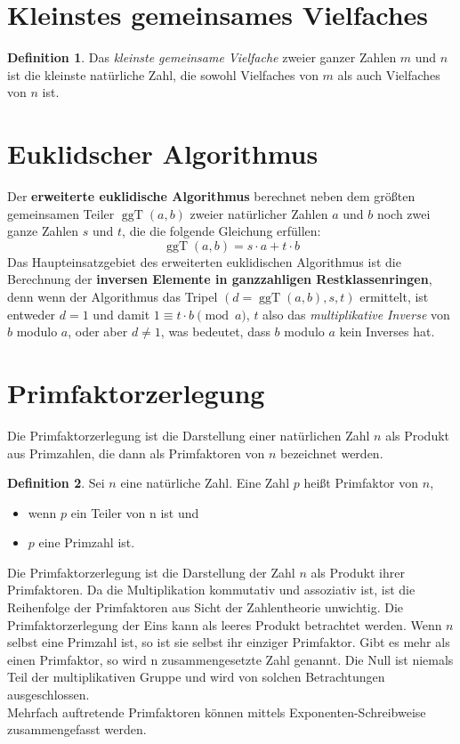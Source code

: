 \documentclass[a4paper,10pt,DIV9, BCOR12mm, oneside,openright,openbib]{scrreprt}
\theoremstyle{definition}
\newtheorem{mydef}{Definition}[section]
\theoremstyle{plain}
\begin{document}
\section{Kleinstes gemeinsames Vielfaches}
\begin{mydef}
Das \textit{kleinste gemeinsame Vielfache} zweier ganzer Zahlen $m$ und $n$ ist die kleinste natürliche Zahl, die sowohl Vielfaches von $m$ als auch Vielfaches von $n$ ist.
\end{mydef}

\section{Euklidscher Algorithmus}
Der \textbf{erweiterte euklidische Algorithmus} berechnet neben dem größten gemeinsamen Teiler $\operatorname{ggT}(a,b)$ zweier natürlicher Zahlen $a$ und $b$ noch zwei ganze Zahlen $s$ und $t$, die die folgende Gleichung erfüllen:
\[\operatorname{ggT}(a,b) = s \cdot a + t \cdot b \]
Das Haupteinsatzgebiet des erweiterten euklidischen Algorithmus ist die Berechnung der \textbf{inversen Elemente in ganzzahligen Restklassenringen}, denn wenn der Algorithmus das Tripel $(d=\operatorname{ggT}(a,b), s, t)$ ermittelt, ist entweder $d=1$ und damit $1\equiv t\cdot b \pmod a$, $t$ also das \textit{multiplikative Inverse} von $b$ modulo $a$, oder aber $d\neq 1$, was bedeutet, dass $b$ modulo $a$ kein Inverses hat.

\section{Primfaktorzerlegung}
Die Primfaktorzerlegung ist die Darstellung einer natürlichen Zahl $n$ als Produkt aus Primzahlen, die dann als Primfaktoren von $n$ bezeichnet werden.
\begin{mydef}
Sei $n$ eine natürliche Zahl. Eine Zahl $p$ heißt Primfaktor von $n$,
\begin{itemize}
 \item wenn $p$ ein Teiler von n ist und 
 \item $p$ eine Primzahl ist.
\end{itemize}
Die Primfaktorzerlegung ist die Darstellung der Zahl $n$ als Produkt ihrer Primfaktoren. Da die Multiplikation kommutativ und assoziativ ist, ist die Reihenfolge der Primfaktoren aus Sicht der Zahlentheorie unwichtig. Die Primfaktorzerlegung der Eins kann als leeres Produkt betrachtet werden. Wenn $n$ selbst eine Primzahl ist, so ist sie selbst ihr einziger Primfaktor. Gibt es mehr als einen Primfaktor, so wird n zusammengesetzte Zahl genannt. Die Null ist niemals Teil der multiplikativen Gruppe und wird von solchen Betrachtungen ausgeschlossen.\\
Mehrfach auftretende Primfaktoren können mittels Exponenten-Schreibweise zusammengefasst werden.
\end{mydef}
\end{document}
